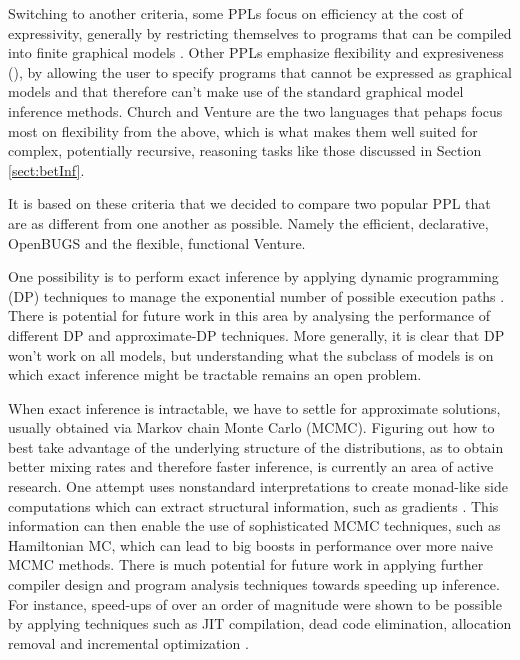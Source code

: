 Switching to another criteria, some PPLs focus on efficiency at the cost of expressivity, generally by restricting themselves to programs that can be compiled into finite graphical models \cite{lunn2009bugs, richardson2006markov, mccallum2009factorie, stan-software:2014, minkainfer}. Other PPLs emphasize flexibility and expresiveness (\cite{milch20071, pfeffer2001ibal, pfeffer2009figaro, goodman2008church}), by allowing the user to specify programs that cannot be expressed as graphical models and that therefore can't make use of the standard graphical model inference methods. Church and Venture are the two languages that pehaps focus most on flexibility from the above, which is what makes them well suited for complex, potentially recursive, reasoning tasks like those discussed in Section \ref{sect:betInf}.

It is based on these criteria that we decided to compare two popular PPL that are as different from one another as possible. Namely the efficient, declarative, OpenBUGS and the flexible, functional Venture.



One possibility is to perform exact inference by applying dynamic programming (DP) techniques to manage the exponential number of possible execution paths \cite{stuhlmuller2012dynamic}. There is potential for future work in this area by analysing the performance of different DP and approximate-DP techniques. More generally, it is clear that DP won’t work on all models, but understanding what the subclass
of models is on which exact inference might be tractable remains an open problem. 

When exact inference is intractable, we have to settle for approximate solutions, usually obtained via Markov chain Monte Carlo (MCMC). Figuring out how to best take advantage of the underlying structure
of the distributions, as to obtain better mixing rates and therefore faster inference, is currently an area of active research. One attempt uses nonstandard interpretations to create monad-like side computations which can extract structural information, such as gradients \cite{wingate2011nonstandard}. This information can then enable the use of sophisticated MCMC techniques, such as Hamiltonian MC, which can lead to big boosts in performance over more naive MCMC methods. There is much potential for future work in applying further compiler design and program analysis techniques towards speeding up inference. For instance, speed-ups of over an order of magnitude were shown to be possible by applying techniques such as JIT compilation, dead code elimination, allocation removal and incremental optimization \cite{yang2013incrementalizing}.

